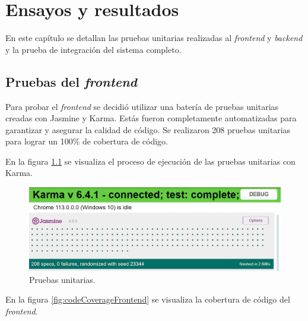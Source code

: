
\chapter{Ensayos y resultados} %

\label{Chapter4} %

En este capítulo se detallan las pruebas unitarias realizadas al \textit{frontend} y \textit{backend} y la prueba de integración del sistema completo.


\section{Pruebas del \emph{frontend}}

Para probar el \textit{frontend} se decidió utilizar una batería de pruebas unitarias \citep{WEBSITE:UNITTESTING} creadas con Jasmine y Karma. Estás fueron completamente automatizadas para garantizar y asegurar la calidad de código. Se realizaron 208 pruebas unitarias para lograr un 100\% de cobertura de código.

En la figura \ref{fig:unitTestingFrontend} se visualiza el proceso de ejecución de las pruebas unitarias con Karma.

\begin{figure}[H]
	\centering
	\includegraphics[width=1.0\textwidth]{./Figures/Frontend unit testing.png}
	\caption{Pruebas unitarias.}
	\label{fig:unitTestingFrontend}
\end{figure}

En la figura \ref{fig:codeCoverageFrontend} se visualiza la cobertura de código del \emph{frontend}.

